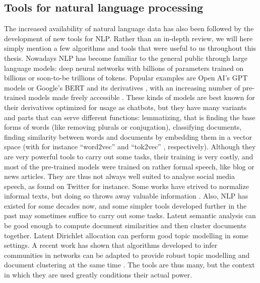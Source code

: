 \documentclass[../thesis.tex]{subfiles}
\begin{document}
\subsection{Tools for natural language processing}
The increased availability of natural language data has also been followed by the
development of new tools for \ac{NLP}. Rather than an in-depth review, we will here
simply mention a few algorithms and tools that were useful to us throughout this thesis.
Nowadays \ac{NLP} has become familiar to the general public through large language
models: deep neural networks with billions of parameters trained on billions or
soon-to-be trillions of tokens. Popular examples are Open AI's GPT models
\cite{BrownLanguageModels2020} or Google's BERT \cite{DevlinBERTPretraining2019} and its
derivatives \cite{SanhDistilBERTDistilled2020}, with an increasing number of pre-trained
models made freely accessible
\cite{WolfTransformersStateoftheArt2020,MontaniExplosionSpaCy2023}. These kinds of
models are best known for their derivatives optimized for usage as chatbots, but they
have many variants and parts that can serve different functions: lemmatizing, that is
finding the base forms of words (like removing plurals or conjugation), classifying
documents, finding similarity between words and documents by embedding them in a vector
space (with for instance ``word2vec'' \cite{MikolovEfficientEstimation2013} and
``tok2vec'' \cite{AngelovTop2VecDistributed2020}, respectively). Although they are very
powerful tools to carry out some tasks, their training is very costly, and most of the
pre-trained models were trained on rather formal speech, like blog or news articles.
They are thus not always well suited to analyse social media speech, as found on Twitter
for instance. Some works have strived to normalize informal texts, but doing so throws
away valuable information \cite{EisensteinWhatBad2013}. Also, \ac{NLP} has existed for
some decades now, and some simpler tools developed further in the past may sometimes
suffice to carry out some tasks. Latent semantic analysis
\cite{DumaisLatentSemantic2004} can be good enough to compute document similarities and
then cluster documents together. Latent Dirichlet allocation
\cite{BleiLatentDirichlet2003} can perform good topic modelling in some settings. A
recent work has shown that algorithms developed to infer communities in networks can be
adapted to provide robust topic modelling and document clustering at the same time
\cite{GerlachNetworkApproach2018}. The tools are thus many, but the context in which
they are used greatly conditions their actual power.
\end{document}
